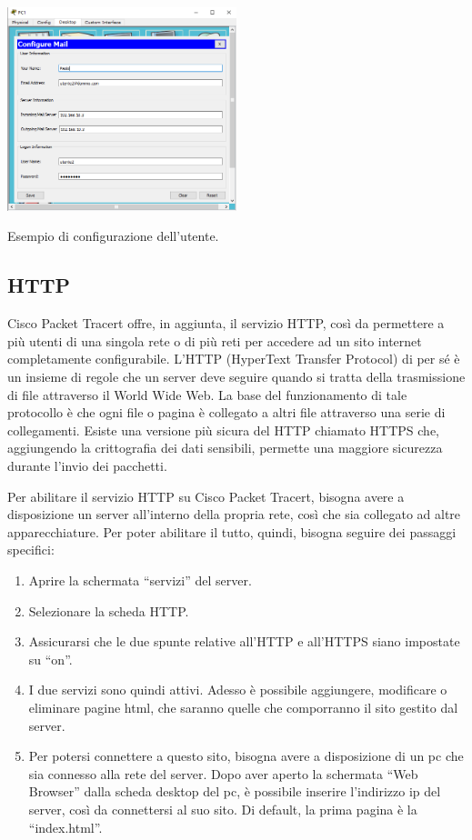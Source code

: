 \begin{sfigure}
    \centering
    \captionsetup{type=figure}
    \includegraphics[width=0.5\textwidth]{images/06.servizi-rete/email/02.test.png}
    \caption{Esempio di configurazione dell’utente.}
    \label{fig:email-conf-client}
\end{sfigure}

\subsection{HTTP}
Cisco Packet Tracert offre, in aggiunta, il servizio HTTP, così da permettere a più utenti di una singola rete o di più reti per accedere ad un sito internet completamente configurabile. L’HTTP (HyperText Transfer Protocol) di per sé è un insieme di regole che un server deve seguire quando si tratta della trasmissione di file attraverso il World Wide Web. La base del funzionamento di tale protocollo è che ogni file o pagina è collegato a altri file attraverso una serie di collegamenti. Esiste una versione più sicura del HTTP chiamato HTTPS che, aggiungendo la crittografia dei dati sensibili, permette una maggiore sicurezza durante l’invio dei pacchetti.

Per abilitare il servizio HTTP su Cisco Packet Tracert, bisogna avere a disposizione un server all’interno della propria rete, così che sia collegato ad altre apparecchiature. Per poter abilitare il tutto, quindi, bisogna seguire dei passaggi specifici:

\begin{enumerate}
    \item Aprire la schermata “servizi” del server.
    \item Selezionare la scheda HTTP.
    \item Assicurarsi che le due spunte relative all’HTTP e all’HTTPS siano impostate su “on”.
    \item I due servizi sono quindi attivi. Adesso è possibile aggiungere, modificare o eliminare pagine html, che saranno quelle che comporranno il sito gestito dal server.
    \item Per potersi connettere a questo sito, bisogna avere a disposizione di un pc che sia connesso alla rete del server. Dopo aver aperto la schermata “Web Browser” dalla scheda desktop del pc, è possibile inserire l’indirizzo ip del server, così da connettersi al suo sito. Di default, la prima pagina è la “index.html”.
\end{enumerate}

